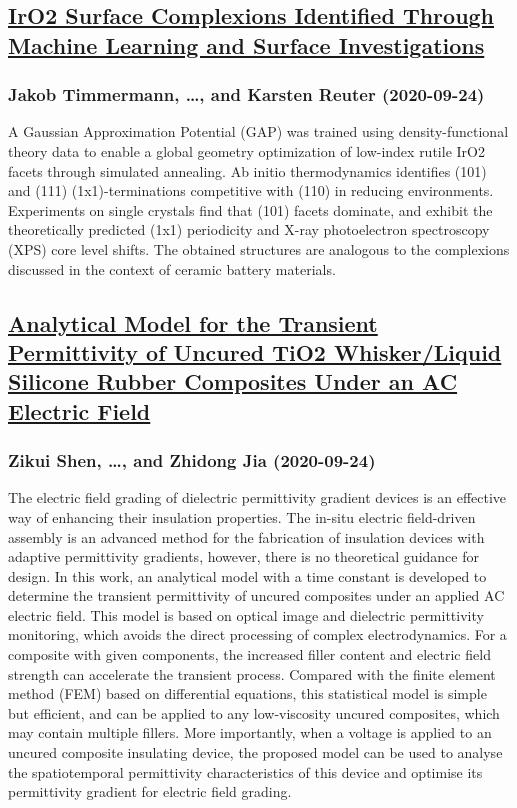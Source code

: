 \subsection*{\href{http://arxiv.org/abs/2009.11569v1}{IrO2 Surface Complexions Identified Through Machine Learning and Surface  Investigations}}
\subsubsection*{Jakob Timmermann, \dots, and Karsten Reuter (2020-09-24)}
A Gaussian Approximation Potential (GAP) was trained using density-functional
theory data to enable a global geometry optimization of low-index rutile IrO2
facets through simulated annealing. Ab initio thermodynamics identifies (101)
and (111) (1x1)-terminations competitive with (110) in reducing environments.
Experiments on single crystals find that (101) facets dominate, and exhibit the
theoretically predicted (1x1) periodicity and X-ray photoelectron spectroscopy
(XPS) core level shifts. The obtained structures are analogous to the
complexions discussed in the context of ceramic battery materials.

\subsection*{\href{http://arxiv.org/abs/2009.11541v1}{Analytical Model for the Transient Permittivity of Uncured TiO2  Whisker/Liquid Silicone Rubber Composites Under an AC Electric Field}}
\subsubsection*{Zikui Shen, \dots, and Zhidong Jia (2020-09-24)}
The electric field grading of dielectric permittivity gradient devices is an
effective way of enhancing their insulation properties. The in-situ electric
field-driven assembly is an advanced method for the fabrication of insulation
devices with adaptive permittivity gradients, however, there is no theoretical
guidance for design. In this work, an analytical model with a time constant is
developed to determine the transient permittivity of uncured composites under
an applied AC electric field. This model is based on optical image and
dielectric permittivity monitoring, which avoids the direct processing of
complex electrodynamics. For a composite with given components, the increased
filler content and electric field strength can accelerate the transient
process. Compared with the finite element method (FEM) based on differential
equations, this statistical model is simple but efficient, and can be applied
to any low-viscosity uncured composites, which may contain multiple fillers.
More importantly, when a voltage is applied to an uncured composite insulating
device, the proposed model can be used to analyse the spatiotemporal
permittivity characteristics of this device and optimise its permittivity
gradient for electric field grading.

